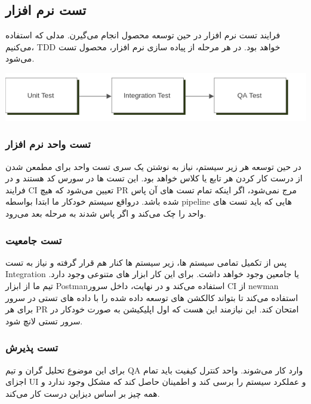 \subsection{تست نرم افزار}

فرایند تست نرم افزار در حین توسعه محصول انجام می‌گیرن. مدلی که استفاده می‌کنیم، TDD خواهد بود. در هر مرحله از پیاده سازی نرم افزار، محصول تست می‌شود.

\includegraphics[scale=1]{assets/testing_DFD.png}

\subsubsection{تست واحد نرم افزار}

در حین توسعه هر زیر سیستم، نیاز به نوشتن یک سری تست واحد برای مطمعن شدن از درست کار کردن هر تابع یا کلاس خواهد بود. این تست ها در سورس کد هستند 
و در فرایند CI تعیین می‌شود که هیچ PR مرج نمی‌شود، اگر اینکه تمام تست های آن پاس شده باشد.
درواقع سیستم خودکار ما ابتدا بواسطه pipeline هایی که باید تست های واحد را چک می‌کند و اگر پاس شدند به مرحله بعد می‌رود.

\subsubsection{تست جامعیت}

پس از تکمیل تمامی سیستم ها، زیر سیستم ها کنار هم قرار گرفته و نیاز به تست Integration یا جامعین وجود خواهد داشت.
برای این کار ابزار های متنوعی وجود دارد. تیم ما از ابزار Postmanاستفاده می‌کند و در نهایت، داخل سرور CI
از newman استفاده می‌کند تا بتواند کالکشن های توسعه داده شده را با داده های تستی در سرور برای هر PR امتحان کند. این نیازمند این هست که اول اپلیکیشن به صورت خودکار در سرور تستی لانچ شود.

\subsubsection{تست پذیرش}

برای این موضوع تحلیل گران و تیم QA وارد کار می‌شوند. واحد کنترل کیفیت باید تمام اجزای UI و عملکرد سیستم را برسی کند و اطمینان حاصل کند که مشکل وجود ندارد و همه چیز بر اساس دیزاین درست کار می‌کند.
